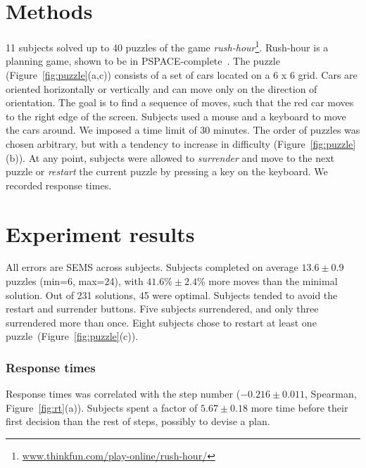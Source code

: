 \documentclass[10pt,letterpaper]{article}
\begin{document}
\vspace{-0.5cm}
\section{Methods}
\vspace{-0.1cm}
11 subjects solved up to 40 puzzles of the game \emph{rush-hour}\footnote{\url{www.thinkfun.com/play-online/rush-hour/}}. Rush-hour is a planning game, shown to be in PSPACE-complete~\cite{flake2002rush}. The puzzle (Figure~\ref{fig:puzzle}(a,c)) consists of a set of cars located on a 6 x 6 grid. Cars are oriented horizontally or vertically and can move only on the direction of orientation. The goal is to find a sequence of moves, such that the red car moves to the right edge of the screen. Subjects used a mouse and a keyboard to move the cars around. We imposed a time limit of 30 minutes. The order of puzzles was chosen arbitrary, but with a tendency to increase in difficulty (Figure~\ref{fig:puzzle}(b)). At any point, subjects were allowed to \emph{surrender} and move to the next puzzle or \emph{restart} the current puzzle by pressing a key on the keyboard. We recorded response times. 

\vspace{-0.1cm}
\section{Experiment results}
\vspace{-0.1cm}
All errors are SEMS across subjects.
Subjects completed on average $13.6 \pm 0.9$ puzzles (min=6, max=24), with $41.6\%\pm 2.4\%$ more moves than the minimal solution. Out of 231 solutions, 45 were optimal. Subjects tended to avoid the restart and surrender buttons. Five subjects surrendered, and only three surrendered more than once. Eight subjects chose to restart at least one puzzle~(Figure~\ref{fig:puzzle}(c)).

\subsubsection{Response times}
Response times was correlated with the step number ($-0.216\pm0.011$, Spearman, Figure~\ref{fig:rt}(a)). Subjects spent a factor of $5.67 \pm 0.18$ more time before their first decision than the rest of steps, possibly to devise a plan.  
\end{document}
